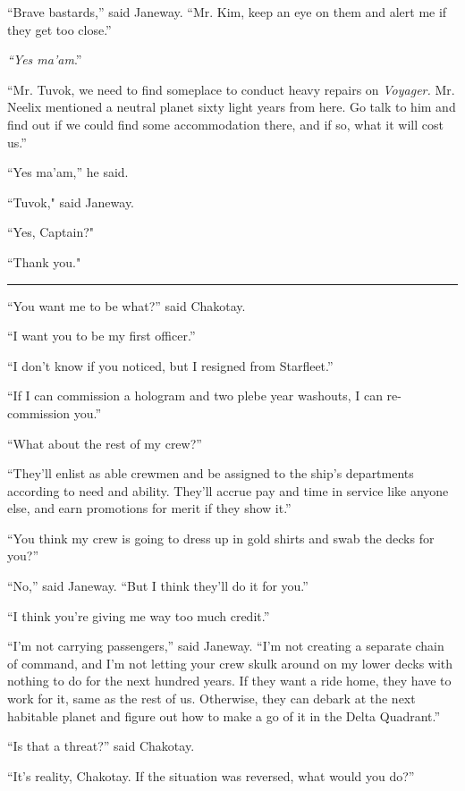 \documentclass[twoside,letterpaper,12pt]{memoir}
\begin{document}
``Brave bastards,” said Janeway. ``Mr. Kim, keep an eye on them and alert me if they get too close.” 

\textit{``Yes ma’am}.” 

``Mr. Tuvok, we need to find someplace to conduct heavy repairs on \textit{Voyager. }Mr. Neelix mentioned a neutral planet sixty light years from here. Go talk to him and find out if we could find some accommodation there, and if so, what it will cost us.” 

``Yes ma’am,” he said. 

``Tuvok," said Janeway.

``Yes, Captain?"

``Thank you."

\begin{center}\rule{3cm}{0.4 pt}\end{center} 

``You want me to be what?” said Chakotay. 

``I want you to be my first officer.” 

``I don’t know if you noticed, but I resigned from Starfleet.” 


``If I can commission a hologram and two plebe year washouts, I can re-commission you.” 

``What about the rest of my crew?” 

``They’ll enlist as able crewmen and be assigned to the ship’s departments according to need and ability. They’ll accrue pay and time in service like anyone else, and earn promotions for merit if they show it.” 

``You think my crew is going to dress up in gold shirts and swab the decks for you?” 

``No,” said Janeway. ``But I think they’ll do it for you.” 

``I think you’re giving me way too much credit.” 

``I’m not carrying passengers,” said Janeway. ``I’m not creating a separate chain of command, and I’m not letting your crew skulk around on my lower decks with nothing to do for the next hundred years. If they want a ride home, they have to work for it, same as the rest of us. Otherwise, they can debark at the next habitable planet and figure out how to make a go of it in the Delta Quadrant.” 

``Is that a threat?” said Chakotay. 

``It’s reality, Chakotay. If the situation was reversed, what would you do?” 
\end{document}
